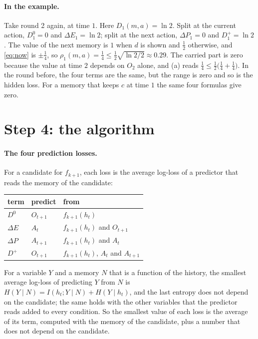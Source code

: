 \documentclass[11pt]{article}
\theoremstyle{definition}
\newcommand{\dE}{\Delta E}
\newcommand{\dP}{\Delta P}
\begin{document}
\paragraph{In the example.} Take round 2 again, at time $1$. Here $D_1(m,a)=\ln2$. Split at the current action, $D^0_1=0$ and $\dE_1=\ln2$; split at the next action, $\dP_1=0$ and $D^+_1=\ln2$. The value of the next memory is $1$ when $d$ is shown and $\tfrac12$ otherwise, and \eqref{eq:now} is $\pm\tfrac14$, so $\rho_1(m,a)=\tfrac14\le\tfrac12\sqrt{\ln2/2}\approx0.29$. The carried part is zero because the value at time $2$ depends on $O_2$ alone, and (a) reads $\tfrac14\le\tfrac12\big(\tfrac14+\tfrac14\big)$. In the round before, the four terms are the same, but the range is zero and so is the hidden loss. For a memory that keeps $c$ at time $1$ the same four formulas give zero.

\section{Step 4: the algorithm}\label{sec:algo}

\paragraph{The four prediction losses.} For a candidate for $f_{k+1}$, each loss is the average log-loss of a predictor that reads the memory of the candidate:
\begin{center}
\small
\begin{tabular}{lll}
\hline
term & predict & from\\
\hline
$D^0$ & $O_{t+1}$ & $f_{k+1}(h_t)$\\
$\dE$ & $A_t$ & $f_{k+1}(h_t)$ and $O_{t+1}$\\
$\dP$ & $A_{t+1}$ & $f_{k+1}(h_t)$ and $A_t$\\
$D^+$ & $O_{t+1}$ & $f_{k+1}(h_t)$, $A_t$ and $A_{t+1}$\\
\hline
\end{tabular}
\end{center}
For a variable $Y$ and a memory $N$ that is a function of the history, the smallest average log-loss of predicting $Y$ from $N$ is $H(Y\mid N)=I(h_t;Y\mid N)+H(Y\mid h_t)$, and the last entropy does not depend on the candidate; the same holds with the other variables that the predictor reads added to every condition. So the smallest value of each loss is the average of its term, computed with the memory of the candidate, plus a number that does not depend on the candidate.
\end{document}
